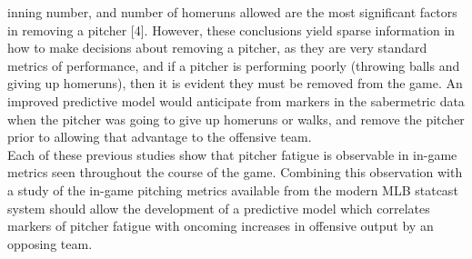 \documentclass[12 pt]{article}
\begin{document}
inning number, and number of homeruns allowed are the most significant factors in removing a pitcher [4]. 
However, these conclusions yield sparse information in how to make decisions about removing a pitcher, 
as they are very standard metrics of performance, and if a pitcher is performing poorly 
(throwing balls and giving up homeruns), then it is evident they must be removed 
from the game. An improved predictive model would anticipate from markers in the sabermetric 
data when the pitcher was going to give up homeruns or walks, and remove the pitcher prior to allowing 
that advantage to the offensive team.
\\ \indent Each of these previous studies show that pitcher fatigue is observable in 
in-game metrics seen throughout the course of the game. Combining this observation with a 
study of the in-game pitching metrics available from the modern MLB statcast system should 
allow the development of a predictive model which correlates markers of pitcher fatigue with 
oncoming increases in offensive output by an opposing team. \\
\end{document}
